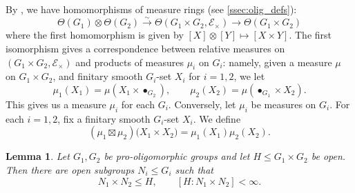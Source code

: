 \documentclass[11pt,a4paper]{amsart}
\theoremstyle{plain}%
\newtheorem{lemma}{Lemma}[subsection]
\theoremstyle{definition}
\theoremstyle{remark}
\begin{document}
By \cite[Section 3.4(c)]{HS-oligomorphic}, we have homomorphisms of measure rings (see \cref{ssec:olig_defs}):
$$ \Theta(G_1)\otimes \Theta(G_2) \xrightarrow{\sim} \Theta(G_1{\times} G_2, \mathcal{E}_{\times}) \to \Theta(G_1\times G_2)$$
where the first homomorphism is given by $[X]\otimes [Y]\mapsto [X\times Y]$. The first {isomorphism gives a correspondence} between relative measures on $(G_1{\times} G_2, \mathcal{E}_{\times})$ and products of measures  $ \mu_i$ on $G_i$: namely,
{given} a measure $\mu$ on $G_1\times G_2$, and finitary smooth $G_i$-set $X_i$ for $i=1,2$, we let
\[\mu_1(X_1)=\mu(X_1\times\bullet_{G_2}),\qquad
\mu_2(X_2)=\mu(\bullet_{G_1}\times X_2).\]
This gives us a measure $\mu_i$ for each $G_i$.
Conversely, let $\mu_i$ be measures on $G_i$. For each $i=1,2$, fix a finitary smooth $G_i$-set $X_i$. We define
\[(\mu_1\boxtimes \mu_2) \bigl(X_1\times X_2\bigr)=\mu_1(X_1)\mu_2({X_2}).\]


\begin{lemma}\label{lem:finite-index-product-subgroup}
Let $G_1,G_2$ be pro-oligomorphic groups and let $H\leq G_1\times G_2$ be open. Then there are open subgroups $N_i\leq G_i$ such that
\[N_1\times N_2\leq H,\qquad [H:N_1\times N_2]<\infty.\]
\end{lemma}
\end{document}
